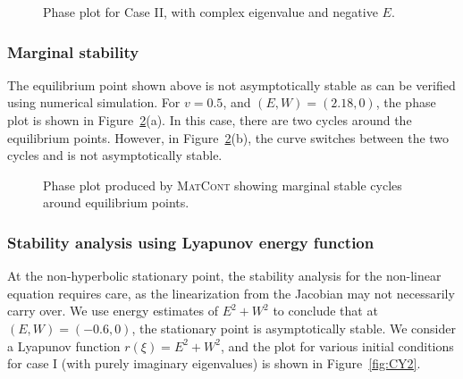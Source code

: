 \documentclass{article}[12pt]
\theoremstyle{plain}
\begin{document}
\begin{figure}[!htb]
\begin{center}
\caption{Phase plot for Case II, with complex eigenvalue and negative $E$.}
\label{fig:caseII}
\end{center}
\end{figure}

\subsubsection{Marginal stability}
The equilibrium point shown above is not asymptotically stable as can be verified using numerical simulation.
For $v=0.5$, and $(E,W)=(2.18,0)$, the phase plot is shown in Figure~\ref{fig:caseII-marginal-stable}(a). In this
case, there are two cycles around the equilibrium points. However, in Figure~\ref{fig:caseII-marginal-stable}(b), the
curve switches between the two cycles and is not asymptotically stable.

\begin{figure}[h!tb]
\begin{center}
\caption{Phase plot produced by \textsc{MatCont} showing marginal stable cycles around equilibrium points.}
\label{fig:caseII-marginal-stable}
\end{center}
\end{figure}


\subsubsection{Stability analysis using Lyapunov energy function}
At the non-hyperbolic stationary point, the stability analysis for the non-linear equation requires care, as the linearization
from the Jacobian may not necessarily carry over. We use energy estimates of $E^2+W^2$ to conclude that at $(E,W)=(-0.6,0)$, the
stationary point is asymptotically stable. We consider a Lyapunov function $r(\xi)=E^2+W^2$, and the plot for various initial
conditions for case I (with purely imaginary eigenvalues) is shown in Figure~\ref{fig:CY2}.
\end{document}
